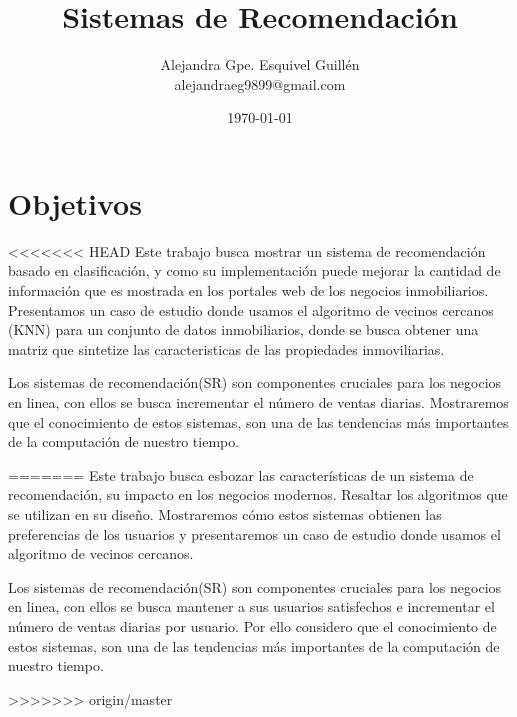 \documentclass[a4paper]{article}
\date{\today}
\author{Alejandra Gpe. Esquivel Guillén \\ alejandraeg9899@gmail.com}
\title{Sistemas de Recomendación}
\begin{document}
\maketitle

\section{Objetivos}
<<<<<<< HEAD
Este trabajo busca mostrar un sistema de recomendación basado en clasificación, y como su implementación puede mejorar la cantidad de información que es mostrada  en los portales web de los negocios inmobiliarios. 
Presentamos un caso de estudio donde usamos el algoritmo de vecinos cercanos (KNN) para un conjunto de datos inmobiliarios, donde se busca obtener una matriz que sintetize las caracteristicas de las propiedades inmoviliarias. 

Los sistemas de recomendación(SR) son componentes cruciales para los negocios en linea, con ellos se busca incrementar el número de ventas diarias. Mostraremos que el conocimiento de estos sistemas, son una de las tendencias más importantes de la computación de nuestro tiempo.










=======
Este trabajo busca esbozar las características de un sistema de recomendación, su impacto en los negocios modernos. Resaltar los algoritmos que se utilizan en su diseño. Mostraremos cómo estos sistemas obtienen las preferencias de los usuarios y presentaremos un caso de estudio donde usamos el algoritmo de vecinos cercanos. 

Los sistemas de recomendación(SR) son componentes cruciales para los negocios en linea, con ellos se busca mantener a sus usuarios satisfechos e incrementar el número de ventas diarias por usuario. Por ello considero que el conocimiento de estos sistemas, son una de las tendencias más importantes de la computación de nuestro tiempo.








>>>>>>> origin/master
\end{document}
